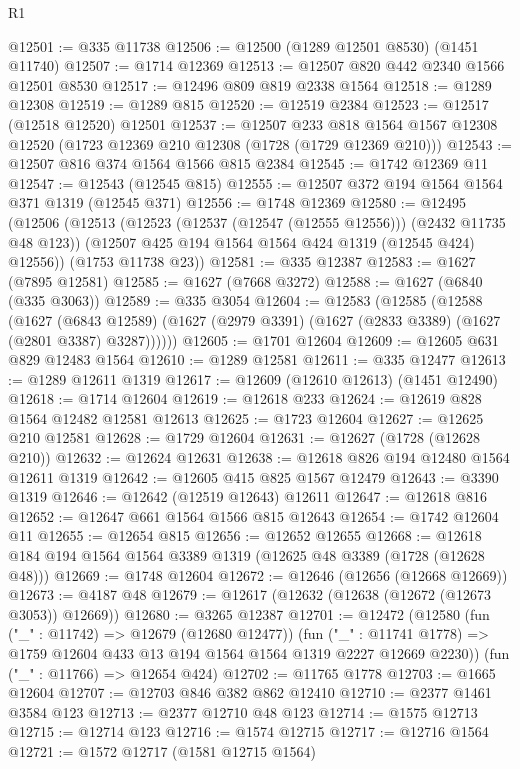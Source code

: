 \begin{lexlean}{R1}
\begin{coremodule}
@12501 := @335 @11738
@12506 := @12500 (@1289 @12501 @8530) (@1451 @11740)
@12507 := @1714 @12369
@12513 := @12507 @820 @442 @2340 @1566 @12501 @8530
@12517 := @12496 @809 @819 @2338 @1564
@12518 := @1289 @12308
@12519 := @1289 @815
@12520 := @12519 @2384
@12523 := @12517 (@12518 @12520) @12501
@12537 := @12507
    @233
    @818
    @1564
    @1567
    @12308
    @12520
    (@1723 @12369 @210 @12308 (@1728 (@1729 @12369 @210)))
@12543 := @12507 @816 @374 @1564 @1566 @815 @2384
@12545 := @1742 @12369 @11
@12547 := @12543 (@12545 @815)
@12555 := @12507 @372 @194 @1564 @1564 @371 @1319 (@12545 @371)
@12556 := @1748 @12369
@12580 := @12495
    (@12506
      (@12513
        (@12523 (@12537 (@12547 (@12555 @12556))) (@2432 @11735 @48 @123))
        (@12507 @425 @194 @1564 @1564 @424 @1319 (@12545 @424) @12556))
      (@1753 @11738 @23))
@12581 := @335 @12387
@12583 := @1627 (@7895 @12581)
@12585 := @1627 (@7668 @3272)
@12588 := @1627 (@6840 (@335 @3063))
@12589 := @335 @3054
@12604 := @12583
    (@12585
      (@12588
        (@1627
          (@6843 @12589)
          (@1627 (@2979 @3391) (@1627 (@2833 @3389) (@1627 (@2801 @3387) @3287))))))
@12605 := @1701 @12604
@12609 := @12605 @631 @829 @12483 @1564
@12610 := @1289 @12581
@12611 := @335 @12477
@12613 := @1289 @12611 @1319
@12617 := @12609 (@12610 @12613) (@1451 @12490)
@12618 := @1714 @12604
@12619 := @12618 @233
@12624 := @12619 @828 @1564 @12482 @12581 @12613
@12625 := @1723 @12604
@12627 := @12625 @210 @12581
@12628 := @1729 @12604
@12631 := @12627 (@1728 (@12628 @210))
@12632 := @12624 @12631
@12638 := @12618 @826 @194 @12480 @1564 @12611 @1319
@12642 := @12605 @415 @825 @1567 @12479
@12643 := @3390 @1319
@12646 := @12642 (@12519 @12643) @12611
@12647 := @12618 @816
@12652 := @12647 @661 @1564 @1566 @815 @12643
@12654 := @1742 @12604 @11
@12655 := @12654 @815
@12656 := @12652 @12655
@12668 := @12618 @184 @194 @1564 @1564 @3389 @1319 (@12625 @48 @3389 (@1728 (@12628 @48)))
@12669 := @1748 @12604
@12672 := @12646 (@12656 (@12668 @12669))
@12673 := @4187 @48
@12679 := @12617 (@12632 (@12638 (@12672 (@12673 @3053)) @12669))
@12680 := @3265 @12387
@12701 := @12472
    (@12580
      (fun ("_" : @11742) => @12679 (@12680 @12477))
      (fun ("_" : @11741 @1778) => @1759 @12604 @433 @13 @194 @1564 @1564 @1319 @2227 @12669 @2230))
    (fun ("_" : @11766) => @12654 @424)
@12702 := @11765 @1778
@12703 := @1665 @12604
@12707 := @12703 @846 @382 @862 @12410
@12710 := @2377 @1461 @3584 @123
@12713 := @2377 @12710 @48 @123
@12714 := @1575 @12713
@12715 := @12714 @123
@12716 := @1574 @12715
@12717 := @12716 @1564
@12721 := @1572 @12717 (@1581 @12715 @1564)

\end{coremodule}
\end{lexlean}
